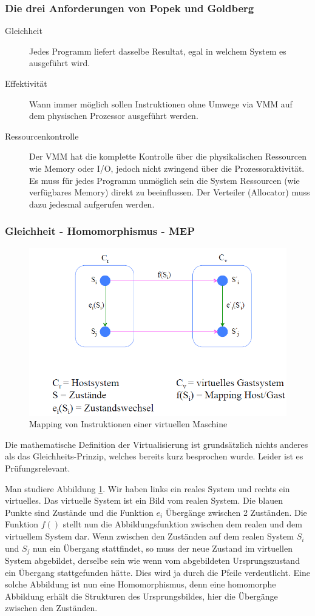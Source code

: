 \subsubsection{Die drei Anforderungen von Popek und Goldberg}
\label{sec:popek-goldberg-anforderungen}
\begin{description}
	\item[Gleichheit] Jedes Programm liefert dasselbe Resultat, egal in welchem System es ausgeführt wird.
	\item[Effektivität] Wann immer möglich sollen Instruktionen ohne Umwege via VMM auf dem physischen Prozessor ausgeführt werden.
	\item[Ressourcenkontrolle] Der VMM hat die komplette Kontrolle über die physikalischen Ressourcen wie Memory oder I/O, jedoch nicht zwingend über die Prozessoraktivität. Es muss für jedes Programm unmöglich sein die System Ressourcen (wie verfügbares Memory) direkt zu beeinflussen. Der Verteiler (Allocator) muss dazu jedesmal aufgerufen werden.
\end{description}

\subsubsection{Gleichheit - Homomorphismus - MEP}
\begin{figure}[]
\centering
\includegraphics[width=0.7\linewidth]{fig/popek_goldberg_mapping}
\caption{Mapping von Instruktionen einer virtuellen Maschine}
\label{fig:popek_goldberg_mapping}
\end{figure}
Die mathematische Definition der Virtualisierung ist grundsätzlich nichts anderes als das Gleichheits-Prinzip, welches bereits kurz besprochen wurde. Leider ist es Prüfungsrelevant.

Man studiere Abbildung \ref{fig:popek_goldberg_mapping}. Wir haben links ein reales System und rechts ein virtuelles. Das virtuelle System ist ein Bild vom realen System. Die blauen Punkte sind Zustände und die Funktion $ e_{i} $ Übergänge zwischen 2 Zuständen. Die Funktion $ f() $ stellt nun die Abbildungsfunktion zwischen dem realen und dem virtuellem System dar. Wenn zwischen den Zuständen auf dem realen System $ S_{i} $ und $ S_{j} $ nun ein Übergang stattfindet, so muss der neue Zustand im virtuellen System abgebildet, derselbe sein wie wenn vom abgebildeten Ursprungszustand ein Übergang stattgefunden hätte. Dies wird ja durch die Pfeile verdeutlicht. Eine solche Abbildung ist nun eine Homomorphismus, denn eine homomorphe Abbildung erhält die Strukturen des Ursprungsbildes, hier die Übergänge zwischen den Zuständen.

